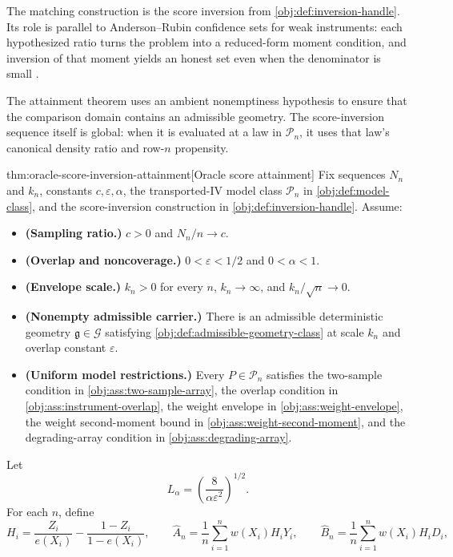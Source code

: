 The matching construction is the score inversion from \cref{obj:def:inversion-handle}.  Its role is parallel to Anderson--Rubin confidence sets for weak instruments: each hypothesized ratio turns the problem into a reduced-form moment condition, and inversion of that moment yields an honest set even when the denominator is small \citep{AndersonRubin1949,Dufour1997,StockWrightYogo2002,Moreira2003,AndrewsMoreiraStock2006,Mikusheva2010,AndrewsStockSun2019}.

The attainment theorem uses an ambient nonemptiness hypothesis to ensure that the comparison domain contains an admissible geometry.  The score-inversion sequence itself is global: when it is evaluated at a law in \(\mathcal P_n\), it uses that law's canonical density ratio and row-\(n\) propensity.

\begin{theoremv}{thm:oracle-score-inversion-attainment}[Oracle score attainment]
Fix sequences \(N_n\) and \(k_n\), constants \(c,\varepsilon,\alpha\), the transported-IV model class \(\mathcal P_n\) in \cref{obj:def:model-class}, and the score-inversion construction in \cref{obj:def:inversion-handle}.  Assume:
\begin{itemize}
\item \textbf{(Sampling ratio.)} \(c>0\) and \(N_n/n\to c\).
\item \textbf{(Overlap and noncoverage.)} \(0<\varepsilon<1/2\) and \(0<\alpha<1\).
\item \textbf{(Envelope scale.)} \(k_n>0\) for every \(n\), \(k_n\to\infty\), and \(k_n/\sqrt n\to0\).
\item \textbf{(Nonempty admissible carrier.)} There is an admissible deterministic geometry \(\mathfrak g\in\mathcal G\) satisfying \cref{obj:def:admissible-geometry-class} at scale \(k_n\) and overlap constant \(\varepsilon\).
\item \textbf{(Uniform model restrictions.)} Every \(P\in\mathcal P_n\) satisfies the two-sample condition in \cref{obj:ass:two-sample-array}, the overlap condition in \cref{obj:ass:instrument-overlap}, the weight envelope in \cref{obj:ass:weight-envelope}, the weight second-moment bound in \cref{obj:ass:weight-second-moment}, and the degrading-array condition in \cref{obj:ass:degrading-array}.
\end{itemize}
Let
\[
L_\alpha=\left(\frac{8}{\alpha\varepsilon^2}\right)^{1/2}.
\]
For each \(n\), define
\[
H_i=\frac{Z_i}{e(X_i)}-\frac{1-Z_i}{1-e(X_i)},\qquad
\widehat A_n=\frac1n\sum_{i=1}^n w(X_i)H_iY_i,\qquad
\widehat B_n=\frac1n\sum_{i=1}^n w(X_i)H_iD_i,
\]
\end{theoremv}
